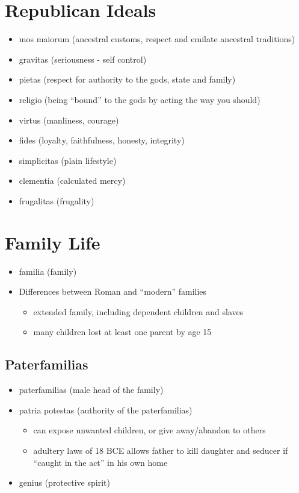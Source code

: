 \documentclass[12pt, twoside]{article}
\begin{document}
\section{Republican Ideals}
\begin{itemize}
\item mos maiorum (ancestral customs, respect and emilate ancestral traditions)
\item gravitas (seriousness - self control) 
\item pietas (respect for authority to the gods, state and family)
\item religio (being “bound” to the gods by acting the way you should)
\item virtus (manliness, courage)
\item fides (loyalty, faithfulness, honesty, integrity)
\item simplicitas (plain lifestyle)
\item clementia (calculated mercy)
\item frugalitas (frugality)
\end{itemize}

\section{Family Life}
\begin{itemize}
\item familia (family)
\item Differences between Roman and “modern” families
	\begin{itemize}
	\item extended family, including dependent children and slaves
	\item many children lost at least one parent by age 15
	\end{itemize}
\end{itemize}

\subsection{Paterfamilias}
\begin{itemize}
\item paterfamilias (male head of the family)
\item patria potestas (authority of the paterfamilias)
	\begin{itemize}
	\item can expose unwanted children, or give away/abandon to others
	\item adultery laws of 18 BCE allows father to kill daughter and seducer if “caught in the act” in his own home
	\end{itemize}
\item genius (protective spirit)
\end{itemize}
\end{document}

